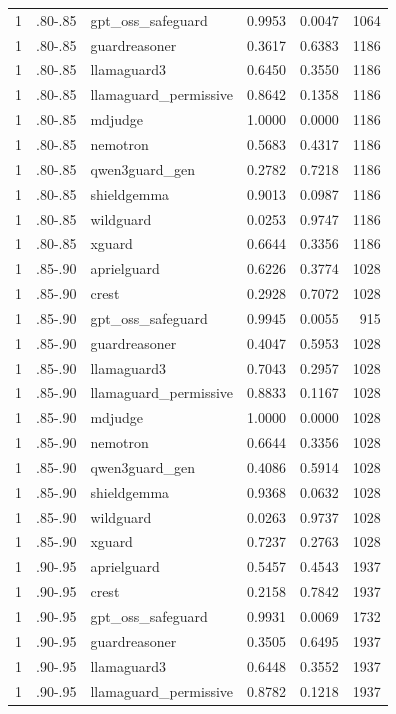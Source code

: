 \begin{tabular}{rllrrr}
1 & .80-.85 & gpt\_oss\_safeguard & 0.9953 & 0.0047 & 1064 \\
1 & .80-.85 & guardreasoner & 0.3617 & 0.6383 & 1186 \\
1 & .80-.85 & llamaguard3 & 0.6450 & 0.3550 & 1186 \\
1 & .80-.85 & llamaguard\_permissive & 0.8642 & 0.1358 & 1186 \\
1 & .80-.85 & mdjudge & 1.0000 & 0.0000 & 1186 \\
1 & .80-.85 & nemotron & 0.5683 & 0.4317 & 1186 \\
1 & .80-.85 & qwen3guard\_gen & 0.2782 & 0.7218 & 1186 \\
1 & .80-.85 & shieldgemma & 0.9013 & 0.0987 & 1186 \\
1 & .80-.85 & wildguard & 0.0253 & 0.9747 & 1186 \\
1 & .80-.85 & xguard & 0.6644 & 0.3356 & 1186 \\
1 & .85-.90 & aprielguard & 0.6226 & 0.3774 & 1028 \\
1 & .85-.90 & crest & 0.2928 & 0.7072 & 1028 \\
1 & .85-.90 & gpt\_oss\_safeguard & 0.9945 & 0.0055 & 915 \\
1 & .85-.90 & guardreasoner & 0.4047 & 0.5953 & 1028 \\
1 & .85-.90 & llamaguard3 & 0.7043 & 0.2957 & 1028 \\
1 & .85-.90 & llamaguard\_permissive & 0.8833 & 0.1167 & 1028 \\
1 & .85-.90 & mdjudge & 1.0000 & 0.0000 & 1028 \\
1 & .85-.90 & nemotron & 0.6644 & 0.3356 & 1028 \\
1 & .85-.90 & qwen3guard\_gen & 0.4086 & 0.5914 & 1028 \\
1 & .85-.90 & shieldgemma & 0.9368 & 0.0632 & 1028 \\
1 & .85-.90 & wildguard & 0.0263 & 0.9737 & 1028 \\
1 & .85-.90 & xguard & 0.7237 & 0.2763 & 1028 \\
1 & .90-.95 & aprielguard & 0.5457 & 0.4543 & 1937 \\
1 & .90-.95 & crest & 0.2158 & 0.7842 & 1937 \\
1 & .90-.95 & gpt\_oss\_safeguard & 0.9931 & 0.0069 & 1732 \\
1 & .90-.95 & guardreasoner & 0.3505 & 0.6495 & 1937 \\
1 & .90-.95 & llamaguard3 & 0.6448 & 0.3552 & 1937 \\
1 & .90-.95 & llamaguard\_permissive & 0.8782 & 0.1218 & 1937 \\

\end{tabular}
